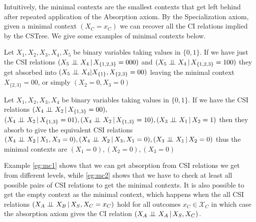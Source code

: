 \documentclass{tufte-book}
\begin{document}
Intuitively, the minimal contexts are the smallest contexts that get left behind after repeated application of the Absorption axiom. By the Specialization axiom, given a minimal context \((X_C=x_C)\) we can recover all the CI relations implied by the CSTree. We give some examples of minimal contexts below.

\begin{example}\label{eg:mc1}
Let $X_1,X_2,X_3,X_4,X_5$ be binary variables taking values in $\{0,1\}$. If we have just the CSI relations $(X_5 \perp \!\!\! \perp X_4 \,|\, X_{\{1,2,3\}}=000)$ and $(X_5 \perp \!\!\! \perp X_4 \,|\, X_{\{1,2,3\}}=100)$ they get absorbed into $(X_5 \perp \!\!\! \perp X_4 | X_{\{1\}}, X_{\{2,3\}}=00)$ leaving the minimal context $X_{\{2,3\}}=00$, or simply $(X_2 = 0, X_3=0)$  
\end{example}

\begin{example}\label{eg:mc2}
Let $X_1,X_2,X_3,X_4$ be binary variables taking values in $\{0,1\}$. If we have the  CSI relations $(X_4 \perp \!\!\! \perp X_2 \,|\, X_{\{1,3\}}=00), $\\$ (X_4 \indep X_2 \,|\, X_{\{1,3\}}=01), (X_4 \indep X_2 \,|\, X_{\{1,3\}}=10), (X_3 \indep X_1 \,|\, X_2=1)$ then they absorb to give the equivalent CSI relations $(X_4 \indep X_2 \, |\,X_1, X_3=0), (X_4 \indep X_2 \,|\, X_3, X_1=0), (X_3 \indep X_1 \,|\,X_2=0)$ thus the minimal contexts are $(X_1=0),(X_2=0),(X_3=0)$
\end{example}

Example \ref{eg:mc1} shows that we can get absorption from CSI relations we get from different levels, while \ref{eg:mc2} shows that we have to check at least all possible pairs of CSI relations to get the minimal contexts. It is also possible to get the empty context as the minimal context, which happens when the all CSI relations \((X_A \perp \!\!\! \perp X_B \,|\, X_S, X_C=x_C)\) hold for all outcomes \(x_C \in \mathcal{X}_C\) in which case the absorption axiom gives the CI relation \((X_A \perp \!\!\! \perp X_A\,|\,X_S,X_C)\).
\end{document}
